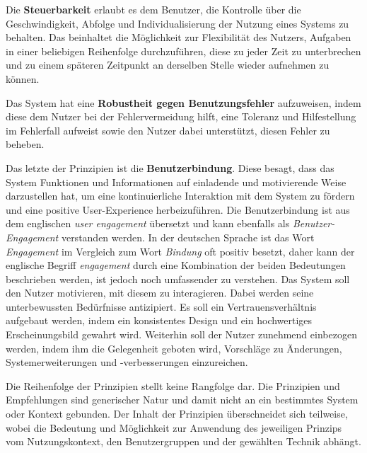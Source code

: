 Die \textbf{Steuerbarkeit} erlaubt es dem Benutzer, die Kontrolle über die Geschwindigkeit, Abfolge und Individualisierung der Nutzung eines Systems zu behalten. Das beinhaltet die Möglichkeit zur Flexibilität des Nutzers, Aufgaben in einer beliebigen Reihenfolge durchzuführen, diese zu jeder Zeit zu unterbrechen und zu einem späteren Zeitpunkt an derselben Stelle wieder aufnehmen zu können.

Das System hat eine \textbf{Robustheit gegen Benutzungsfehler} aufzuweisen, indem diese dem Nutzer bei der Fehlervermeidung hilft, eine Toleranz und Hilfestellung im Fehlerfall aufweist sowie den Nutzer dabei unterstützt, diesen Fehler zu beheben.

Das letzte der Prinzipien ist die \textbf{Benutzerbindung}. Diese besagt, dass das System Funktionen und Informationen auf einladende und motivierende Weise darzustellen hat, um eine kontinuierliche Interaktion mit dem System zu fördern und eine positive User-Experience herbeizuführen. Die Benutzerbindung ist aus dem englischen \textit{user engagement} übersetzt und kann ebenfalls als \textit{Benutzer-Engagement} verstanden werden. In der deutschen Sprache ist das Wort \textit{Engagement} im  Vergleich zum Wort \textit{Bindung} oft positiv besetzt, daher kann der englische Begriff \textit{engagement} durch eine Kombination der beiden Bedeutungen beschrieben werden, ist jedoch noch umfassender zu verstehen.
Das System soll den Nutzer motivieren, mit diesem zu interagieren. Dabei werden seine unterbewussten Bedürfnisse antizipiert. Es soll ein Vertrauensverhältnis aufgebaut werden, indem ein konsistentes Design und ein hochwertiges Erscheinungsbild gewahrt wird. Weiterhin soll der Nutzer zunehmend einbezogen werden, indem ihm die Gelegenheit geboten wird, Vorschläge zu Änderungen, Systemerweiterungen und -verbesserungen einzureichen. 

Die Reihenfolge der Prinzipien stellt keine Rangfolge dar. Die Prinzipien und Empfehlungen sind generischer Natur und damit nicht an ein bestimmtes System oder Kontext gebunden. Der Inhalt der Prinzipien überschneidet sich teilweise, wobei die Bedeutung und Möglichkeit zur Anwendung des jeweiligen Prinzips vom Nutzungskontext, den Benutzergruppen und der gewählten Technik abhängt. 
\cite[Zusammenfassung nach][]{DIN_EN_ISO_9241-110}